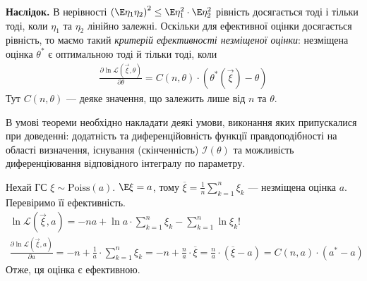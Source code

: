 \noindent\textbf{Наслідок.} В нерівності $\left( \E\eta_1 \eta_2 \right)^2 \leq \E\eta_1^2 \cdot \E\eta_2^2$ рівність досягається
тоді і тільки тоді, коли $\eta_1$ та $\eta_2$ лінійно залежні. Оскільки для ефективної оцінки досягається рівність, то маємо такий 
\emph{критерій ефективності незміщеної оцінки}: незміщена оцінка $\theta^*$ є оптимальною тоді й тільки тоді, коли
\begin{gather}
    \frac{\partial\ln \mathcal{L}(\vec{\xi}, \theta)}{\partial \theta} = C(n, \theta) \cdot\left(\theta^*(\vec{\xi}) - \theta\right)
\end{gather}
Тут $C(n, \theta)$ --- деяке значення, що залежить лише від $n$ та $\theta$.
\begin{remark}
    В умові теореми необхідно накладати деякі умови, виконання яких припускалися при доведенні: додатність та 
    диференційовність функції правдоподібності на області визначення,
    існування (скінченність) $\mathcal{I}(\theta)$ та можливість диференціювання відповідного інтегралу по параметру.
\end{remark}
\begin{example}
    Нехай ГС $\xi \sim \mathrm{Poiss}(a)$. $\E\xi = a$, тому $\overline{\xi} = \frac{1}{n}\sum\limits_{k=1}^n \xi_k$ --- 
    незміщена оцінка $a$. Перевіримо її ефективність.
    \begin{gather*}
        \ln \mathcal{L}(\vec{\xi}, a) = -n a + \ln a \cdot \sum\limits_{k=1}^n \xi_k - \sum\limits_{k=1}^n \ln{\xi_k!} \\
        \frac{\partial  \ln \mathcal{L}(\vec{\xi}, a)}{\partial a} = -n + \frac{1}{a} \cdot \sum\limits_{k=1}^n \xi_k = 
        -n + \frac{n}{a} \cdot \overline{\xi} = \frac{n}{a} \cdot(\overline{\xi} - a) = C(n, a) \cdot(a^* - a)
    \end{gather*}
    Отже, ця оцінка є ефективною.
\end{example}

